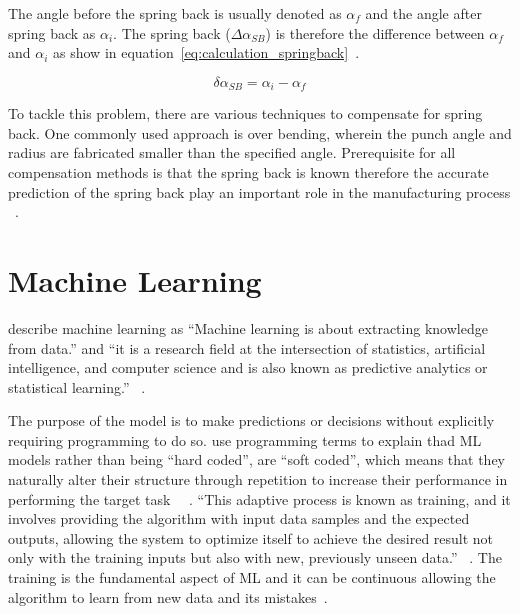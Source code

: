 The angle before the spring back is usually denoted as $\alpha_f$ and the angle after spring back as $\alpha_i$.
The spring back ($\Delta \alpha_{SB}$) is therefore the difference between $\alpha_f$ and
$\alpha_i$ as show in equation~\ref*{eq:calculation_springback}~\cite[p. 6]{cruz_applicationmachinelearning_2021}.

\begin{equation}
    \delta \alpha_{SB} = \alpha_i - \alpha_f
    \label{eq:calculation_springback}
\end{equation}

To tackle this problem, there are various techniques to compensate for spring back.
One commonly used approach is over bending, wherein the punch angle and radius are fabricated smaller than the
specified angle.
Prerequisite for all compensation methods is that the spring back is known therefore
the accurate prediction of the spring back play an important role in the manufacturing
process ~\cite[p. 114]{groover_fundamentalsmodernmanufacturing_2020}.


\section{Machine Learning}\label{sec:machine-learning}
\cite{muller_introductionmachinelearning_2016} describe machine learning as ``Machine learning is about extracting
knowledge from data.'' and ``it is a research field at the intersection of statistics, artificial intelligence, and
computer science and is also known as predictive analytics or statistical learning.''
~\cite[p. 1]{muller_introductionmachinelearning_2016}.

The purpose of the model is to make predictions or decisions without explicitly requiring programming to do so.
\cite{el2015machine} use programming terms to explain thad ML models rather than being ``hard coded'', are ``soft
coded'', which means that they naturally alter their structure through repetition to increase their performance in
performing the target task ~\cite[pp. 4]{el2015machine}~\cite[pp. 151--170]{koza1996automated}.
``This adaptive process is known as training, and it involves providing the algorithm with input data samples and the
expected outputs, allowing the system to optimize itself to achieve the desired result not only with the training
inputs but also with new, previously unseen data.''
~\cite[pp. 4]{el2015machine}.
The training is the fundamental aspect of \ac{ML} and it can be continuous allowing the algorithm to
learn from new data and its mistakes~\cite[pp. 4]{el2015machine}.

